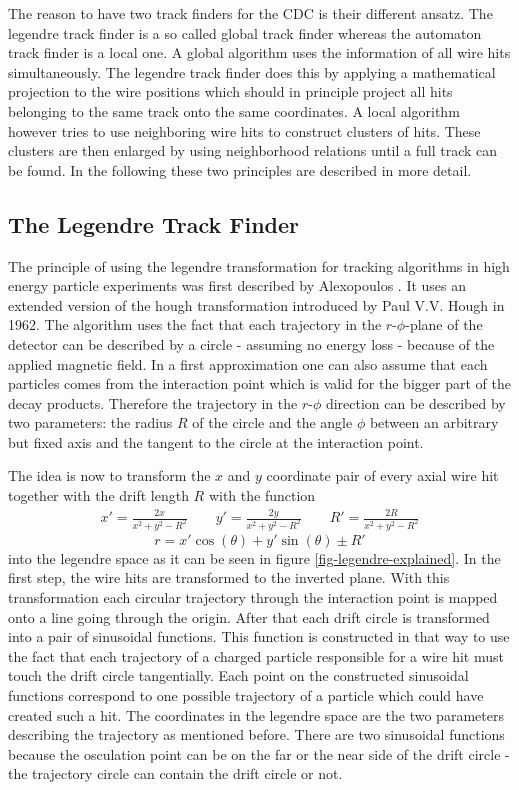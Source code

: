 The reason to have two track finders for the CDC is their different ansatz. The legendre track finder is a so called global track finder whereas the automaton track finder is a local one. A global algorithm uses the information of all wire hits simultaneously. The legendre track finder does this by applying a mathematical projection to the wire positions which should in principle project all hits belonging to the same track onto the same coordinates. A local algorithm however tries to use neighboring wire hits to construct clusters of hits. These clusters are then enlarged by using neighborhood relations until a full track can be found. In the following these two principles are described in more detail.

\subsection{The Legendre Track Finder}
The principle of using the legendre transformation for tracking algorithms in high energy particle experiments was first described by Alexopoulos \cite{legendre}. It uses an extended version of the hough transformation introduced by Paul V.V. Hough in 1962. The algorithm uses the fact that each trajectory in the $r$-$\phi$-plane of the detector can be described by a circle - assuming no energy loss - because of the applied magnetic field. In a first approximation one can also assume that each particles comes from the interaction point which is valid for the bigger part of the decay products. Therefore the trajectory in the $r$-$\phi$ direction can be described by two parameters: the radius $R$ of the circle and the angle $\phi$ between an arbitrary but fixed axis and the tangent to the circle at the interaction point.

The idea is now to transform the $x$ and $y$ coordinate pair of every axial wire hit together with the drift length $R$ with the function
\begin{align*} x' = \frac{2x}{x^2 + y^2 - R^2} \qquad y' = \frac{2y}{x^2 + y^2 - R^2}  \qquad R' = \frac{2R}{x^2 + y^2 - R^2} \end{align*}
$$r = x' \cos(\theta) + y' \sin(\theta) \pm R'$$
into the legendre space as it can be seen in figure \ref{fig-legendre-explained}. In the first step, the wire hits are transformed to the inverted plane. With this transformation each circular trajectory through the interaction point is mapped onto a line going through the origin. After that each drift circle is transformed into a pair of sinusoidal functions. This function is constructed in that way to use the fact that each trajectory of a charged particle responsible for a wire hit must touch the drift circle tangentially. Each point on the constructed sinusoidal functions correspond to one possible trajectory of a particle which could have created such a hit. The coordinates in the legendre space are the two parameters describing the trajectory as mentioned before. There are two sinusoidal functions because the osculation point can be on the far or the near side of the drift circle - the trajectory circle can contain the drift circle or not.

